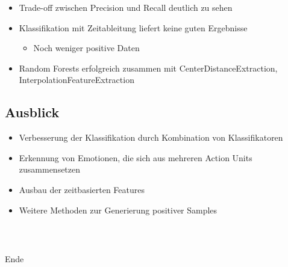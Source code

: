 \documentclass{beamer}
\begin{document}
\begin{frame}
  \begin{itemize}
    \item Trade-off zwischen Precision und Recall deutlich zu sehen
    \item Klassifikation mit Zeitableitung liefert keine guten Ergebnisse
      \begin{itemize}
        \item Noch weniger positive Daten
      \end{itemize}
    \item Random Forests erfolgreich zusammen mit CenterDistanceExtraction, InterpolationFeatureExtraction
  \end{itemize}
\end{frame}

\subsection{Ausblick}
\begin{frame}
  \begin{itemize}
    \item Verbesserung der Klassifikation durch Kombination von Klassifikatoren
    \item Erkennung von Emotionen, die sich aus mehreren Action Units zusammensetzen
    \item Ausbau der zeitbasierten Features
    \item Weitere Methoden zur Generierung positiver Samples
  \end{itemize}
\end{frame}

\begin{frame}[c]
  \frametitle{~}
  \begin{center}
    \Huge Ende
  \end{center}
\end{frame}
\end{document}
